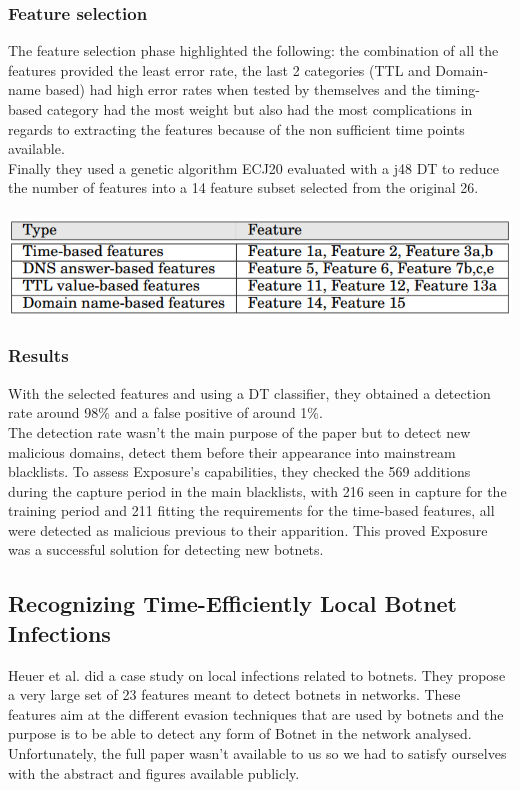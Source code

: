 \subsubsection{Feature selection}
The feature selection phase highlighted the following: the combination of all the features provided the least error rate, the last 2 categories (TTL and Domain-name based) had high error rates when tested by themselves and the timing-based category had the most weight but also had the most complications in regards to extracting the features because of the non sufficient time points available. \\
Finally they used a genetic algorithm ECJ20 evaluated with a j48 DT to reduce the number of features into a 14 feature subset selected from the original 26.\\\\

\includegraphics[scale=.7]{img/exposure_ga.png}

\subsubsection{Results}
With the selected features and using a DT classifier, they obtained a detection rate around 98\% and a false positive of around 1\%. \\The detection rate wasn't the main purpose of the paper but to detect new malicious domains, detect them before their appearance into mainstream blacklists. To assess Exposure's capabilities, they checked the 569 additions during the capture period in the main blacklists, with 216 seen in capture for the training period and 211 fitting the requirements for the time-based features, all were detected as malicious previous to their apparition. This proved Exposure was a successful solution for detecting new botnets.

\subsection{Recognizing Time-Efficiently Local Botnet Infections}
Heuer et al.\cite{localbotnet} did a case study on local infections related to botnets. They propose a very large set of 23 features meant to detect botnets in networks. These features aim at the different evasion techniques that are used by botnets and the purpose is to be able to detect any form of Botnet in the network analysed. Unfortunately, the full paper wasn't available to us so we had to satisfy ourselves with the abstract and figures available publicly.

